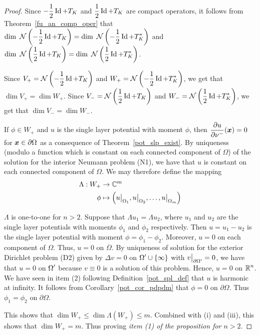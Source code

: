 \begin{proof}
Since $\displaystyle -\frac{1}{2} \operatorname{Id} + T_K$ and
$\displaystyle \frac{1}{2} \operatorname{Id} + T_K$ are compact operators, it
follows from Theorem~\ref{fu_an_comp_oper} that
$\displaystyle \dim\ \mathcal{N} \left(-\frac{1}{2} \operatorname{Id} + T_K\right) =
\dim\ \mathcal{N} \left(-\frac{1}{2} \operatorname{Id} + T_K^\ast \right)$ and \\
$\displaystyle \dim\ \mathcal{N} \left(\frac{1}{2} \operatorname{Id} + T_K\right) =
\dim\ \mathcal{N} \left(\frac{1}{2} \operatorname{Id} + T_K^\ast \right)$.

Since $\displaystyle V_+ = \mathcal{N} \left(-\frac{1}{2} \operatorname{Id} + T_K\right)$
and $\displaystyle W_+ = \mathcal{N} \left(-\frac{1}{2} \operatorname{Id} + T_K^\ast \right)$, 
we get that $\dim V_+ = \dim W_+$.  Since
$\displaystyle V_- = \mathcal{N} \left(\frac{1}{2} \operatorname{Id} + T_K\right)$
and $\displaystyle W_- = \mathcal{N} \left(\frac{1}{2} \operatorname{Id} + T_K^\ast \right)$, 
we get that $\dim V_- = \dim W_-$.

 If $\phi \in W_+$ and $u$ is the single layer potential with
moment $\phi$, then $\displaystyle \frac{\partial{u}}{\partial \nu^-}({\bm{x}}) = 0$
for ${\bm{x}} \in \partial \Omega$ as a consequence of
Theorem~\ref{pot_slp_exist}.  By uniqueness (modulo a
function which is constant on each connected component of $\Omega$)
of the solution for the interior Neumann problem (N1), we have that
$u$ is constant on each connected component of $\Omega$.  We may
therefore define the mapping
\begin{align*}
\Lambda : W_+ & \rightarrow \mathbb{C}^m \\
\phi &\mapsto \left( u\big|_{\Omega_1}, u\big|_{\Omega_2},
\ldots, u\big|_{\Omega_m}\right)
\end{align*}

 $\Lambda$ is one-to-one for $n>2$.  Suppose that
$\Lambda u_1 = \Lambda u_2$, where $u_1$ and $u_2$ are the single
layer potentials with moments $\phi_1$ and $\phi_2$ respectively.
Then $u=u_1-u_2$ is the single layer potential with moment
$\phi = \phi_1-\phi_2$.  Moreover, $u = 0$ on each component of
$\Omega$.  Thus, $u = 0$ on $\overline{\Omega}$.  By uniqueness of
solution for the exterior Dirichlet problem (D2) given by
$\Delta v = 0$ on $\displaystyle \Omega^{\prime} \cup \{\infty\}$ 
with $\displaystyle v\big|_{\partial \Omega^{\prime}}=0$,
we have that $u=0$ on $\displaystyle \Omega^{\prime}$ because
$v \equiv 0$ is a solution of this problem.  Hence, $u=0$ on
$\displaystyle \mathbb{R}^n$.
We have seen in item (2) following Definition~\ref{pot_spl_def} that
$u$ is harmonic at infinity.
It follows from Corollary~\ref{pot_cor_pdpdm} that $\phi =0$ on
$\partial \Omega$.  Thus $\phi_1=\phi_2$ on $\partial \Omega$.

This shows that $\dim W_+ \leq \dim \Lambda(W_+) \leq m$.  Combined
with (i) and (iii), this shows that $\dim W_+ = m$.  Thus proving
{\em item (1) of the proposition for $n>2$}.


\end{proof}
